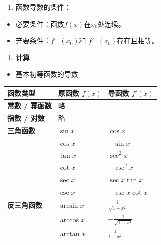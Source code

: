\documentclass[
]{article}
\newcounter{none} %
\begin{document}
\begin{enumerate}
\def\labelenumi{\arabic{enumi}.}
\item
  函数导数的条件：
\end{enumerate}

\begin{itemize}
\item
  必要条件：函数\(f(x)\)在\(x_0\)处连续。
\item
  充要条件：\(f'_-(x_0)\)和 \( f'_+(x_0)\)存在且相等。
\end{itemize}

\begin{enumerate}
\def\labelenumi{\arabic{enumi}.}
\item
  \textbf{计算}
\end{enumerate}

\begin{itemize}
\item
  基本初等函数的导数
\end{itemize}

{\def\LTcaptype{none} %
\begin{longtable}[]{@{}lll@{}}
\toprule\noalign{}
\textbf{函数类型} & \textbf{原函数 \(f(x)\)} & \textbf{导函数
\(f'(x)\)} \\
\midrule\noalign{}
\endhead
\bottomrule\noalign{}
\endlastfoot
\textbf{常数 / 幂函数} & 略 & \\
\textbf{指数 / 对数} & 略 & \\
\textbf{三角函数} & \(\sin x\) & \(\cos x\) \\
& \(\cos x\) & \(-\sin x\) \\
& \(\tan x\) & \(\sec^2 x\) \\
& \(\cot x\) & \(-\csc^2 x\) \\
& \(\sec x\) & \(\sec x \tan x\) \\
& \(\csc x\) & \(-\csc x \cot x\) \\
\textbf{反三角函数} & \(\arcsin x\) & \(\frac{1}{\sqrt{1-x^2}}\) \\
& \(\arccos x\) & \(-\frac{1}{\sqrt{1-x^2}}\) \\
& \(\arctan x\) & \(\frac{1}{1+x^2}\) \\
\end{longtable}
}
\end{document}
